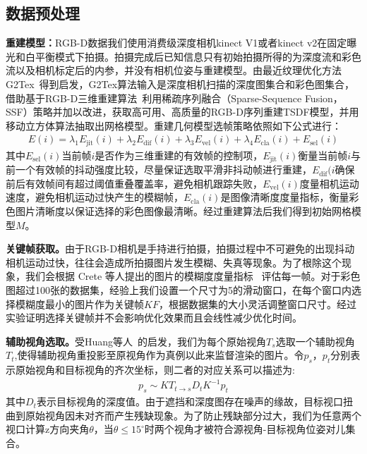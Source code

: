 \subsection{数据预处理}
\noindent\textbf{重建模型：}RGB-D数据我们使用消费级深度相机kinect V1或者kinect v2在固定曝光和白平衡模式下拍摄。拍摄完成后已知信息只有初始拍摄所得的为深度流和彩色流以及相机标定后的内参，并没有相机位姿与重建模型。由最近纹理优化方法G2Tex~\cite{fu2018texture}得到启发，G2Tex算法输入是深度相机扫描的深度图集合和彩色图集合，借助基于RGB-D三维重建算法~\cite{LongYang2018SurfaceRV}利用稀疏序列融合（Sparse-Sequence Fusion，SSF）策略并加以改进，获取高可用、高质量的RGB-D序列重建TSDF模型，并用移动立方体算法抽取出网格模型。重建几何模型选帧策略依照如下公式进行：
\begin{align}
E(i)= \lambda_{1} E_{\mathrm{jit}}(i)+\lambda_{2} E_{\mathrm{dif}}(i)+\lambda_{3} E_{\mathrm{vel}}(i)+\lambda_{4}E_{\mathrm{cla}}(i)+E_{\mathrm{sel}}(i)
\end{align}
其中$E_{\mathrm{sel}}(i)$当前帧$i$是否作为三维重建的有效帧的控制项，$E_{\mathrm{jit}}(i)$衡量当前帧$i$与前一个有效帧的抖动强度比较，尽量保证选取平滑非抖动帧进行重建，$E_{\mathrm{dif}}(i$确保前后有效帧间有超过阈值重叠覆盖率，避免相机跟踪失败，$E_{\mathrm{vel}}(i)$度量相机运动速度，避免相机运动过快产生的模糊帧，$E_{\mathrm{cla}}(i)$是图像清晰度度量指标，衡量彩色图片清晰度以保证选择的彩色图像最清晰。经过重建算法后我们得到初始网格模型$M$。\par
\noindent\textbf{关键帧获取。}由于RGB-D相机是手持进行拍摄，拍摄过程中不可避免的出现抖动相机运动过快，往往会造成所拍摄图片发生模糊、失真等现象。为了根除这个现象，我们会根据 Crete 等人提出的图片的模糊度度量指标 ~\cite{FrederiqueCrete2007TheBE}评估每一帧。对于彩色图超过100张的数据集，经验上我们设置一个尺寸为5的滑动窗口，在每个窗口内选择模糊度最小的图片作为关键帧$KF$，根据数据集的大小灵活调整窗口尺寸。经过实验证明选择关键帧并不会影响优化效果而且会线性减少优化时间。 \par
\noindent\textbf{辅助视角选取。}受Huang等人~\cite{JingweiHuang2020AdversarialTO}的启发，我们为每个原始视角$T_s$选取一个辅助视角$T_t$,使得辅助视角重投影至原视角作为真例以此来监督渲染的图片。令$p_s$，$p_t$分别表示原始视角和目标视角的齐次坐标，则二者的对应关系可以描述为:
\begin{align}
	p_s\sim KT_{t\rightarrow s}D_tK^{-1}p_t \label{work1:wrap}
\end{align}
其中$D_t$表示目标视角的深度值。由于遮挡和深度图存在噪声的缘故，目标视口扭曲到原始视角因未对齐而产生残缺现象。为了防止残缺部分过大，我们为任意两个视口计算z方向夹角$\theta$，当$\theta\le15^{\circ}$时两个视角才被符合源视角-目标视角位姿对儿集合。

